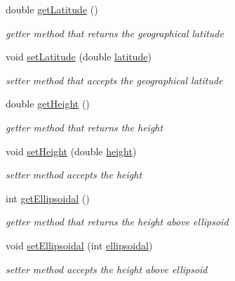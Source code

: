 \begin{DoxyCompactItemize}
double \hyperlink{classcoordinates_1_1_geographic_coordinate_a7c030f592a3644f178c07d79b89382a0}{get\+Latitude} ()
\begin{DoxyCompactList}\small\item\em getter method that returns the geographical latitude \end{DoxyCompactList}\item 
void \hyperlink{classcoordinates_1_1_geographic_coordinate_a8baf5c2c81a9cd60ca73f74d63509775}{set\+Latitude} (double \hyperlink{classcoordinates_1_1_geographic_coordinate_a07a18abcc3cd691d4d8821a875dabbd6}{latitude})
\begin{DoxyCompactList}\small\item\em setter method that accepts the geographical latitude \end{DoxyCompactList}\item 
double \hyperlink{classcoordinates_1_1_geographic_coordinate_aea53916d3d136bf18262dc096c468104}{get\+Height} ()
\begin{DoxyCompactList}\small\item\em getter method that returns the height \end{DoxyCompactList}\item 
void \hyperlink{classcoordinates_1_1_geographic_coordinate_ab4d53507e2fb93d1e16bffffcf21ecb4}{set\+Height} (double \hyperlink{classcoordinates_1_1_geographic_coordinate_a928334b65b117d99cd724d2c0b9b7ee0}{height})
\begin{DoxyCompactList}\small\item\em setter method accepts the height \end{DoxyCompactList}\item 
int \hyperlink{classcoordinates_1_1_geographic_coordinate_a1e330f3f407a29251d66204401e80e85}{get\+Ellipsoidal} ()
\begin{DoxyCompactList}\small\item\em getter method that returns the height above ellipsoid \end{DoxyCompactList}\item 
void \hyperlink{classcoordinates_1_1_geographic_coordinate_a1c76ad1e5e1cd8c9ff738d3cdf1c4d0a}{set\+Ellipsoidal} (int \hyperlink{classcoordinates_1_1_geographic_coordinate_ab14ea3abf8e94174e4eff69ab983282e}{ellipsoidal})
\begin{DoxyCompactList}\small\item\em setter method accepts the height above ellipsoid \end{DoxyCompactList}\end{DoxyCompactItemize}
